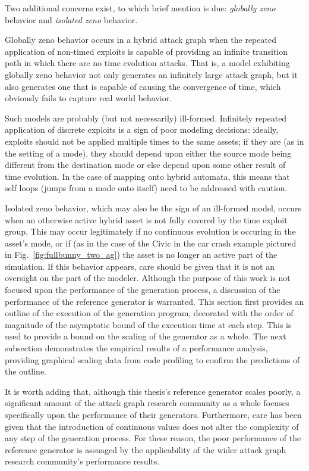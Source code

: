 Two additional concerns exist, to which brief mention is due: \emph{globally 
zeno} behavior and \emph{isolated zeno} behavior.

Globally zeno behavior occurs in a hybrid attack graph when the
repeated application of non-timed exploits is capable of providing an infinite
transition path in which there are no time 
evolution attacks. That is, a model exhibiting globally zeno behavior not only
generates an infinitely large attack graph, but it also generates one that is
capable of causing the convergence of time, which obviously fails to
capture real world behavior.

Such models are probably (but
not necessarily) ill-formed. Infinitely repeated application of discrete
exploits is a sign of poor modeling decisions: ideally, exploits should not be
applied multiple times to the same assets; if they are (as in the setting of a
mode), they should depend upon either the source mode being different from the
destination mode or else depend upon some other result of time evolution. In the
case of mapping onto hybrid automata, this means that self loops (jumps from a
mode onto itself) need to be addressed with caution.

Isolated zeno behavior, which may also be the sign of an ill-formed model, 
occurs when an otherwise active hybrid asset is not fully covered by the time
exploit group. This may occur legitimately if no continuous evolution is
occuring in the asset's mode, or if (as in the case of the Civic in the
car crash example pictured in Fig.~\ref{fig:fullbunny_two_ag}) the asset is
no longer an active part of the simulation. If this behavior appears, care 
should be given that it is not an oversight on the part of the modeler.
Although the purpose of this work is not focused upon the performance of the
generation process, a discussion of the performance of the reference
generator is warranted. This section first
provides an outline of the execution of the generation program, decorated with
the order of magnitude of the asymptotic bound of the execution time at
each step. This is used to provide a bound on the scaling of the generator as
a whole. The next subsection demonstrates the empirical results of a performance
analysis, providing graphical scaling data from code profiling
to confirm the predictions of the outline.

It is worth adding that, although this thesis's reference generator scales 
poorly, a significant amount of the attack graph research community as a whole
focuses specifically upon the performance of their generators. Furthermore, care
has been given that the introduction of continuous values does not alter the
complexity of any step of the generation process. For these reason,
the poor performance of the reference generator is assuaged by the applicability
of the wider attack graph research community's performance results.

